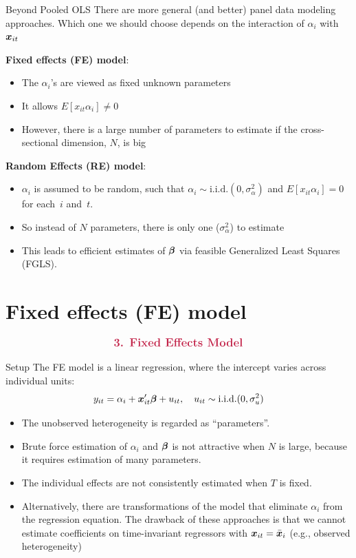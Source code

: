 \documentclass[english, professionalfonts,smaller,xcolor=dvipsnames]{beamer}
\newcommand{\sectionframe}[2]{%
\begin{frame}[plain,noframenumbering]
$$
\text{\large \textcolor{brightmaroon}{\bf #1. #2}}
$$
\end{frame}
}
\begin{document}
\begin{frame}{Beyond Pooled OLS}
There are more general (and better) panel data modeling approaches. Which one we should choose depends on the interaction of $\alpha_i$ with $\bm x_{it}$

\textbf{Fixed effects (FE) model}:
\begin{itemize}
\item The $\alpha_i$'s are viewed as fixed unknown parameters
\item It allows $E[x_{it} \alpha_i] \neq 0$
\item However, there is a large number of parameters to estimate if the cross-sectional dimension, $N$, is big
\end{itemize}
\textbf{Random Effects (RE) model}: 
\begin{itemize}
\item $\alpha_i$ is assumed to be random, such that $\alpha_i \sim \text{i.i.d.}(0,\sigma_{\alpha}^2)$ and $ E[x_{it}\alpha_i] = 0$ for each~$i$ and~$t$.
\item So instead of $N$ parameters, there is only one ($\sigma_\alpha^2$) to estimate
\item This leads to efficient estimates of $\bm \beta$ via feasible Generalized Least Squares (FGLS).
\end{itemize}
\end{frame}


\section{Fixed effects (FE) model}

\sectionframe{3}{Fixed Effects Model}

\begin{frame}{Setup}
The FE model is a linear regression, where the intercept varies across individual units:
$$
y_{it} = \alpha_i + \bm x_{it}'\bm \beta + u_{it}, \quad u_{it}\sim\text{i.i.d.}(0,\sigma_u^2)
$$
\begin{itemize}
\item The unobserved heterogeneity is regarded as ``parameters''.
\item Brute force estimation of $\alpha_{i}$ and $\bm \beta$ is not attractive when $N$ is large, because it requires estimation of many parameters.
\item The individual effects are not consistently estimated when $T$ is fixed.
\item Alternatively, there are transformations of the model that eliminate $\alpha_i$ from the regression equation. The drawback of these approaches is that we cannot estimate coefficients on time-invariant regressors with $\bm x_{it} = \bar{\bm x}_i$ (e.g., observed heterogeneity)
\end{itemize}
\end{frame}
\end{document}
